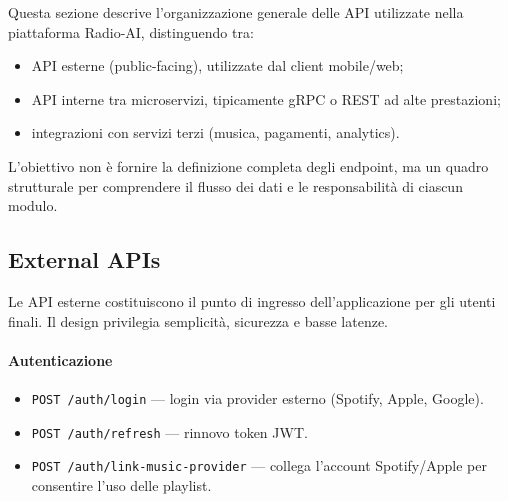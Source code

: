\documentclass[11pt,a4paper]{article}
\begin{document}
Questa sezione descrive l’organizzazione generale delle API utilizzate nella piattaforma Radio-AI, distinguendo tra:
\begin{itemize}
    \item API esterne (public-facing), utilizzate dal client mobile/web;
    \item API interne tra microservizi, tipicamente gRPC o REST ad alte prestazioni;
    \item integrazioni con servizi terzi (musica, pagamenti, analytics).
\end{itemize}

L’obiettivo non è fornire la definizione completa degli endpoint, ma un quadro strutturale per comprendere il flusso dei dati e le responsabilità di ciascun modulo.


\subsection{External APIs}

Le API esterne costituiscono il punto di ingresso dell’applicazione per gli utenti finali.  
Il design privilegia semplicità, sicurezza e basse latenze.

\paragraph{Autenticazione}
\begin{itemize}
    \item \verb|POST /auth/login| — login via provider esterno (Spotify, Apple, Google).
    \item \verb|POST /auth/refresh| — rinnovo token JWT.
    \item \verb|POST /auth/link-music-provider| — collega l’account Spotify/Apple per consentire l’uso delle playlist.
\end{itemize}
\end{document}

